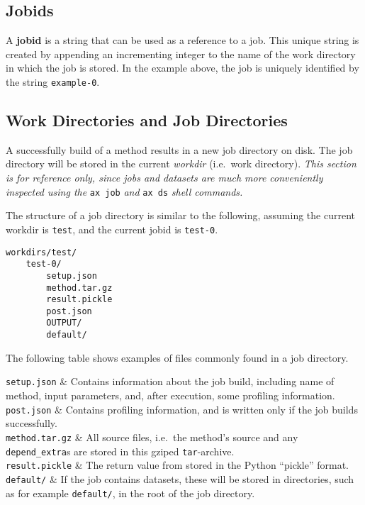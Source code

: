 \subsection{Jobids}
A \textbf{jobid} is a string that can be used as a reference to a job.
This unique string is created by appending an incrementing integer to
the name of the work directory in which the job is stored.  In the
example above, the job is uniquely identified by the
string \texttt{example-0}.



\subsection{Work Directories and Job Directories}
\label{sec:job_directories}
A successfully build of a method results in a new job directory on
disk.  The job directory will be stored in the
current \textsl{workdir} (i.e.\ work directory).  \emph{This section
is for reference only, since jobs and datasets are much more
conveniently inspected using the} \texttt{ax job} \emph{and} \texttt{ax ds}
\emph{shell commands.}

The structure of a job directory is similar to the following, assuming
the current workdir is
\texttt{test}, and the current jobid is \texttt{test-0}.
\begin{verbatim}
workdirs/test/
    test-0/
        setup.json
        method.tar.gz
        result.pickle
        post.json
        OUTPUT/
        default/
\end{verbatim}
The following table shows examples of files commonly found in a job
directory.

\starttabletwo

\texttt{setup.json} & Contains information about the job build,
including name of method, input parameters, and, after execution, some
profiling information.\\

\texttt{post.json} & Contains profiling information, and is written
only if the job builds successfully.\\

\texttt{method.tar.gz} & All source files, i.e.\ the method's source
and any \texttt{depend\_extra}s are stored in this gziped
\texttt{tar}-archive.\\

\texttt{result.pickle} & The return value from \synthesis stored in the
Python ``pickle'' format.\\

\texttt{default/} & If the job contains datasets, these will be stored
in directories, such as for example \texttt{default/}, in the root of
the job directory.\\

